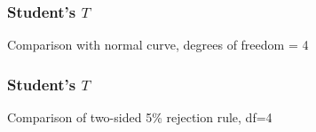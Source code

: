 \documentclass[handout]{beamer}
\begin{document}
   \begin{frame}
   \frametitle{Student's $T$}
   \begin{center}
   \end{center}
   Comparison with normal curve, degrees of freedom = 4
   \end{frame}



   \begin{frame}
   \frametitle{Student's $T$}
   \begin{center}
   \end{center}
   Comparison of two-sided {\color{blue} 5\% rejection rule}, df=4
   \end{frame}
\end{document}
